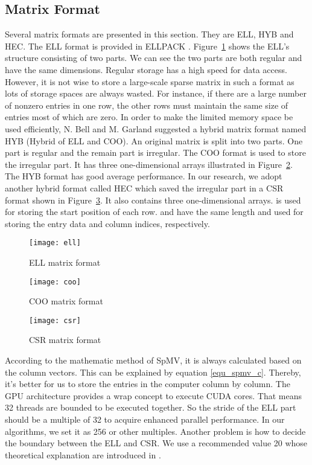 \documentclass[runningheads,a4paper]{llncs}
\begin{document}
{\subsection{Matrix Format}
Several matrix formats are presented in this section. They are ELL, HYB and HEC. The ELL format is provided in ELLPACK \cite{ellpack}. Figure~\ref{fig_ell} shows the ELL's structure consisting of two parts. We can see the two parts are both regular and have the same dimensions. Regular storage has a high speed for data access. However, it is not wise to store a large-scale sparse matrix in such a format as lots of storage spaces are always wasted. For instance, if there are a large number of nonzero entries in one row, the other rows must maintain the same size of entries most of which are zero. In order to make the limited memory space be used efficiently, N. Bell and M. Garland suggested a hybrid matrix format named HYB (Hybrid of ELL and COO). An original matrix is split into two parts. One part is regular and the remain part is irregular. The COO format is used to store the irregular part. It has three one-dimensional arrays illustrated in Figure~\ref{fig_coo}. The HYB format has good average performance. In our research, we adopt another hybrid format called HEC which saved the irregular part in a CSR format shown in Figure~\ref{fig_csr}. It also contains three one-dimensional arrays.  is used for storing the start position of each row.  and  have the same length and used for storing the entry data and column indices, respectively.

\begin{figure}[!tbh]
    \centering
    \texttt{[image: ell]}
    \caption{ELL matrix format}
    \label{fig_ell}
\end{figure}

\begin{figure}[!tbh]
    \centering
    \texttt{[image: coo]}
    \caption{COO matrix format}
    \label{fig_coo}
\end{figure}

\begin{figure}[!tbh]
    \centering
    \texttt{[image: csr]}
    \caption{CSR matrix format}
    \label{fig_csr}
\end{figure}

According to the mathematic method of SpMV, it is always calculated based on the column vectors. This can be explained by equation \eqref{equ_spmv_c}. Thereby, it's better for us to store the entries in the computer column by column. The GPU architecture provides a wrap concept to execute CUDA cores. That means 32 threads are bounded to be executed together. So the stride of the ELL part should be a multiple of 32 to acquire enhanced parallel performance. In our algorithms, we set it as 256 or other multiples. Another problem is how to decide the boundary between the ELL and CSR. We use a recommended value 20 whose theoretical explanation are introduced in \cite{nv-spmv2}.




}
\end{document}

